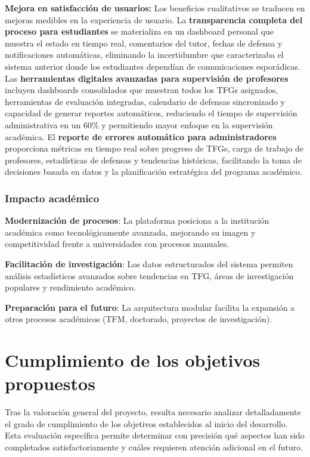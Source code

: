 \documentclass[12pt,a4paper,oneside]{report}
\begin{document}
\textbf{Mejora en satisfacción de usuarios:} Los beneficios cualitativos se traducen en mejoras medibles en la experiencia de usuario. La \textbf{transparencia completa del proceso para estudiantes} se materializa en un dashboard personal que muestra el estado en tiempo real, comentarios del tutor, fechas de defensa y notificaciones automáticas, eliminando la incertidumbre que caracterizaba el sistema anterior donde los estudiantes dependían de comunicaciones esporádicas. Las \textbf{herramientas digitales avanzadas para supervisión de profesores} incluyen dashboards consolidados que muestran todos los TFGs asignados, herramientas de evaluación integradas, calendario de defensas sincronizado y capacidad de generar reportes automáticos, reduciendo el tiempo de supervisión administrativa en un 60\% y permitiendo mayor enfoque en la supervisión académica. El \textbf{reporte de errores automático para administradores} proporciona métricas en tiempo real sobre progreso de TFGs, carga de trabajo de profesores, estadísticas de defensas y tendencias históricas, facilitando la toma de decisiones basada en datos y la planificación estratégica del programa académico.

\subsubsection{Impacto académico}\label{impacto-acaduxe9mico}

\textbf{Modernización de procesos}: La plataforma posiciona a la
institución académica como tecnológicamente avanzada, mejorando su
imagen y competitividad frente a universidades con procesos manuales.

\textbf{Facilitación de investigación}: Los datos estructurados del sistema permiten análisis estadísticos avanzados sobre tendencias en TFG, áreas de investigación populares y rendimiento académico.

\textbf{Preparación para el futuro}: La arquitectura modular facilita la
expansión a otros procesos académicos (TFM, doctorado, proyectos de
investigación).

\section{Cumplimiento de los objetivos
propuestos}\label{cumplimiento-de-los-objetivos-propuestos}

Tras la valoración general del proyecto, resulta necesario analizar detalladamente el grado de cumplimiento de los objetivos establecidos al inicio del desarrollo. Esta evaluación específica permite determinar con precisión qué aspectos han sido completados satisfactoriamente y cuáles requieren atención adicional en el futuro.
\end{document}
